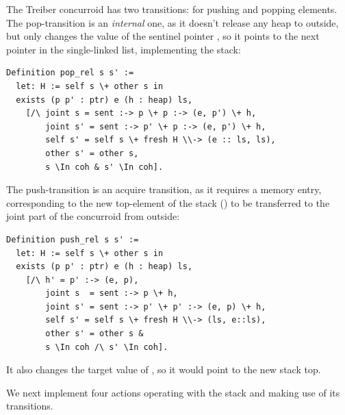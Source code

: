 

The Treiber concurroid has two transitions: for pushing and popping
elements. The pop-transition is an \emph{internal} one, as it doesn't
release any heap to outside, but only changes the value of the
sentinel pointer , so it points to the next pointer
 in the single-linked list, implementing the stack:

\begin{lstlisting}
Definition pop_rel s s' :=
  let: H := self s \+ other s in
  exists (p p' : ptr) e (h : heap) ls, 
    [/\ joint s = sent :-> p \+ p :-> (e, p') \+ h,
        joint s' = sent :-> p' \+ p :-> (e, p') \+ h, 
        self s' = self s \+ fresh H \\-> (e :: ls, ls),
        other s' = other s,
        s \In coh & s' \In coh].  
\end{lstlisting}

The push-transition is an acquire transition, as it requires a memory
entry, corresponding to the new top-element of the stack () to be transferred to the joint part of the concurroid from
outside:

\begin{lstlisting}
Definition push_rel s s' :=
  let: H := self s \+ other s in
  exists (p p' : ptr) e (h : heap) ls, 
    [/\ h' = p' :-> (e, p),
        joint s  = sent :-> p \+ h,
        joint s' = sent :-> p' \+ p' :-> (e, p) \+ h, 
        self s' = self s \+ fresh H \\-> (ls, e::ls),
        other s' = other s &  
        s \In coh /\ s' \In coh].  
\end{lstlisting}

It also changes the target value of , so it would point to
the new stack top.

We next implement four actions operating with the stack and making
use of its transitions. 

